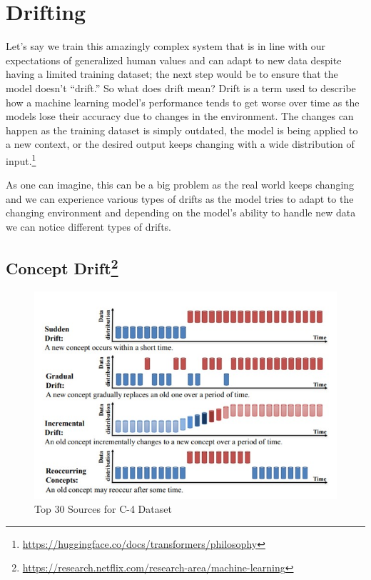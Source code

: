 \documentclass[
]{book}
\begin{document}
\hypertarget{drifting}{%
\section{Drifting}\label{drifting}}

Let's say we train this amazingly complex system that is in line with our expectations of generalized human values and can adapt to new data despite having a limited training dataset; the next step would be to ensure that the model doesn't ``drift.'' So what does drift mean? Drift is a term used to describe how a machine learning model's performance tends to get worse over time as the models lose their accuracy due to changes in the environment. The changes can happen as the training dataset is simply outdated, the model is being applied to a new context, or the desired output keeps changing with a wide distribution of input.\footnote{\url{https://huggingface.co/docs/transformers/philosophy}}

As one can imagine, this can be a big problem as the real world keeps changing and we can experience various types of drifts as the model tries to adapt to the changing environment and depending on the model's ability to handle new data we can notice different types of drifts.

\hypertarget{concept-drift5}{%
\subsection[Concept Drift]{\texorpdfstring{Concept Drift\footnote{\url{https://research.netflix.com/research-area/machine-learning}}}{Concept Drift}}\label{concept-drift5}}

\begin{figure}
\centering
\includegraphics{figures/figure6.png}
\caption{Top 30 Sources for C-4 Dataset}
\end{figure}
\end{document}
